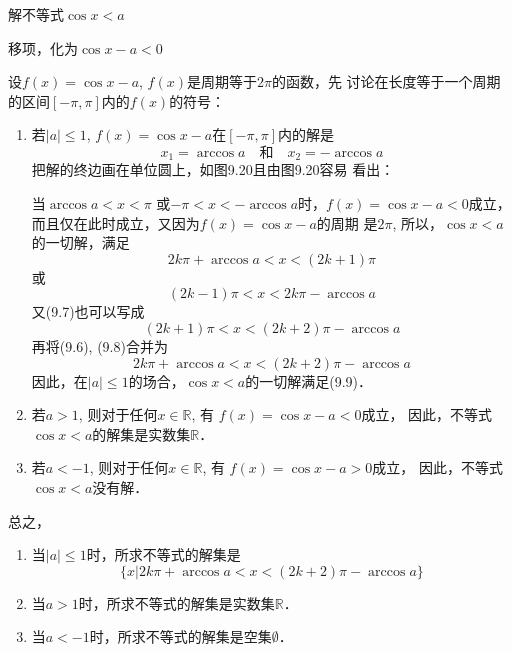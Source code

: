 \begin{example}
    解不等式$\cos x<a$
\end{example}

\begin{solution}
移项，化为$\cos x-a<0$

设$f(x)=\cos x-a$, $f(x)$是周期等于$2\pi$的函数，先
讨论在长度等于一个周期的区间$[-\pi,\pi]$内的$f(x)$的符号：
\begin{enumerate}
    \item 若$|a|\le 1$, $f(x)=\cos x-a$在$[-\pi,\pi]$内的解是
\[x_1=\arccos a\quad \text{和}\quad x_2=-\arccos a\]
把解的终边画在单位圆上，如图9.20且由图9.20容易
看出：
\begin{figure}[htp]
    \centering
{}
    \caption{}
\end{figure}

当$\arccos a<x<\pi$ 或$-\pi <x<-\arccos a$时，$f(x)=\cos x-
a<0$成立，而且仅在此时成立，又因为$f(x)=\cos x-a$的周期
是$2\pi$, 所以，$\cos x<a$的一切解，满足
\begin{equation}
   2k\pi +\arccos a<x<(2k+1)\pi  
\end{equation}
或
\begin{equation}
    (2k-1)\pi <x<2k\pi -\arccos a
\end{equation}
又(9.7)也可以写成
\begin{equation}
    (2k+1)\pi <x<(2k+2)\pi -\arccos a
\end{equation}
再将(9.6), (9.8)合并为
\begin{equation}
    2k\pi +\arccos a<x<(2k+2)\pi -\arccos a
\end{equation} 
因此，在$|a|\le 1$的场合，$\cos x<a$的一切解满足(9.9)．

\item 若$a>1$, 则对于任何$x\in\mathbb{R}$, 有
$f(x)=\cos x-a<0$成立，
因此，不等式$\cos x<a$的解集是实数集$\mathbb{R}$．
\item 若$a<-1$, 则对于任何$x\in\mathbb{R}$, 有
$f(x)=\cos x-a>0$成立，
因此，不等式$\cos x<a$没有解．
\end{enumerate}

总之，
\begin{enumerate}
\item 当$|a|\le 1$时，所求不等式的解集是
\[\{x|2k\pi  +\arccos a<x<(2k+2)\pi -\arccos a\}\]
\item 当$a>1$时，所求不等式的解集是实数集$\mathbb{R}$．
\item 当$a<-1$时，所求不等式的解集是空集$\emptyset$．
\end{enumerate}
\end{solution}


